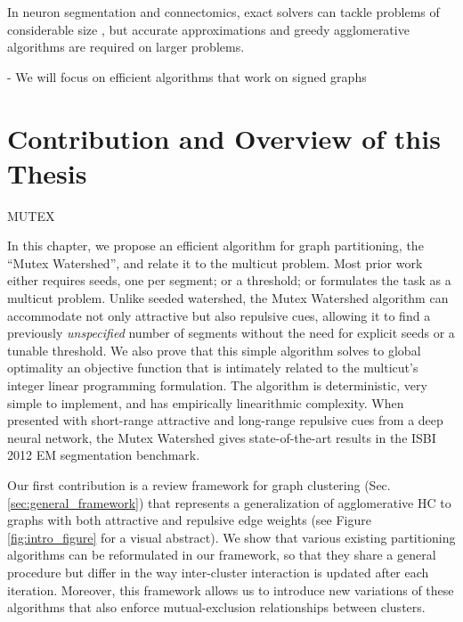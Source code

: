 In neuron segmentation and connectomics, exact solvers can tackle problems of considerable size \cite{andres2012globally}, but accurate approximations \cite{pape2017solving,yarkony2012fast} and greedy agglomerative algorithms \cite{levinkov2017comparative,wolf2019mutex,bailoni2019generalized} are required on larger problems.





- We will focus on efficient algorithms that work on signed graphs


\section{Contribution and Overview of this Thesis}

MUTEX

In this chapter, we propose an efficient algorithm for graph partitioning, the ``Mutex Watershed'', and relate it to the multicut problem. 
Most prior work either requires seeds, one per segment; or a threshold; or formulates the task as a multicut problem. 
Unlike seeded watershed, the Mutex Watershed algorithm can accommodate not only attractive but also repulsive cues, allowing it to find a previously \emph{unspecified} number of segments without the need for explicit seeds or a tunable threshold. We also prove that this simple algorithm solves to global optimality an objective function that is intimately related to the multicut's integer linear programming formulation. 
The algorithm is deterministic, very simple to implement, and has empirically linearithmic complexity. 
When presented with short-range attractive and long-range repulsive cues from a deep neural network, the Mutex Watershed gives state-of-the-art results in the %
 ISBI 2012 EM segmentation benchmark.

 



Our first contribution is a review framework for graph clustering (Sec. \ref{sec:general_framework}) that represents a generalization of agglomerative HC to graphs with both attractive and repulsive edge weights (see Figure \ref{fig:intro_figure} for a visual abstract). 
We show that various existing partitioning algorithms \cite{levinkov2017comparative,wolf2018mutex,kardoostsolving,lance1967general} can be reformulated in our framework, so that they share a general procedure but differ in the way inter-cluster interaction is updated after each iteration. Moreover, this framework allows us to introduce new variations of these algorithms that also enforce mutual-exclusion relationships between clusters.  

